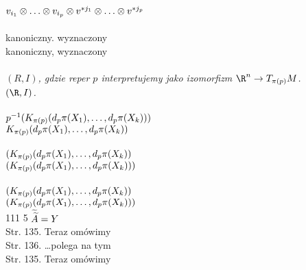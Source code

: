 \documentclass[a4paper,11pt]{article}
\begin{document}
\Pow $v_{ i_{ 1 } } \otimes \ldots \otimes v_{ i_{ p } } \otimes v^{ * j_{ 1 } } \otimes
\ldots \otimes v^{ * j_{ p } }$ \\
 \\
\Jest kanoniczny. wyznaczony \\
\Pow  kanoniczny, wyznaczony \\
 \\
\Jest \emph{$( R, I )$, gdzie reper $p$ interpretujemy jako izomorfizm
  $\R^{ n } \to T_{ \pi( p ) }M$.} \\
\Pow \emph{$( \R, I )$.} \\
 \\
\Jest $p^{ -1 }( K_{ \pi( p ) }( d_{ p }\pi( X_{ 1 } ), \ldots, d_{ p }\pi( X_{ k } ) ) )$ \\
\Pow  $K_{ \pi( p ) }( d_{ p }\pi( X_{ 1 } ), \ldots, d_{ p }\pi( X_{ k } ) )$ \\
 \\
\Jest $( K_{ \pi( p ) }( d_{ p }\pi( X_{ 1 } ), \ldots,
d_{ p }\pi( X_{ k } ) )$ \\
\Pow $( K_{ \pi( p ) }( d_{ p }\pi( X_{ 1 } ), \ldots,
d_{ p }\pi( X_{ k } ) ) )$ \\
 \\
\Jest $( K_{ \pi( p ) }( d_{ p }\pi( X_{ 1 } ), \ldots,
d_{ p }\pi( X_{ k } ) )$ \\
\Pow $( K_{ \pi( p ) }( d_{ p }\pi( X_{ 1 } ), \ldots,
d_{ p }\pi( X_{ k } ) ) )$ \\


111 5 $\widetilde{ \widetilde{ A } } = Y$ \\
Str. 135. Teraz omówimy\ld \\
Str. 136. \ldots polega na tym\ld \\
Str. 135. Teraz omówimy\ld \\





 {}



\end{document}
